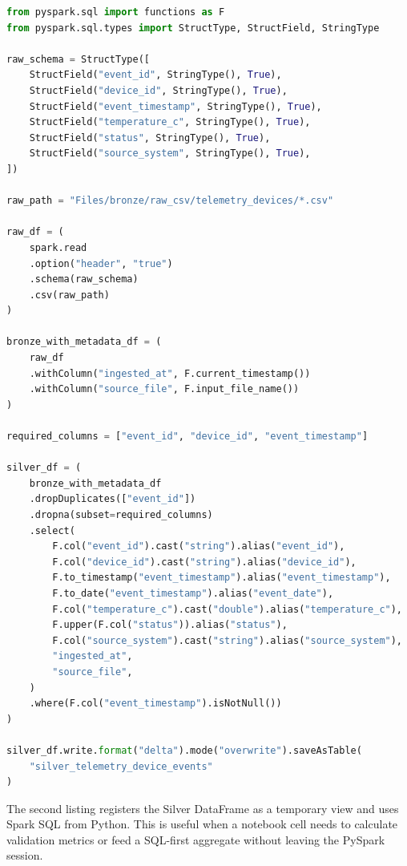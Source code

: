 \begin{lstlisting}[language=Python,caption={PySpark Bronze CSV to cleaned Silver Delta table.},label={lst:chapter3-bronze-csv-silver-delta}]
from pyspark.sql import functions as F
from pyspark.sql.types import StructType, StructField, StringType

raw_schema = StructType([
    StructField("event_id", StringType(), True),
    StructField("device_id", StringType(), True),
    StructField("event_timestamp", StringType(), True),
    StructField("temperature_c", StringType(), True),
    StructField("status", StringType(), True),
    StructField("source_system", StringType(), True),
])

raw_path = "Files/bronze/raw_csv/telemetry_devices/*.csv"

raw_df = (
    spark.read
    .option("header", "true")
    .schema(raw_schema)
    .csv(raw_path)
)

bronze_with_metadata_df = (
    raw_df
    .withColumn("ingested_at", F.current_timestamp())
    .withColumn("source_file", F.input_file_name())
)

required_columns = ["event_id", "device_id", "event_timestamp"]

silver_df = (
    bronze_with_metadata_df
    .dropDuplicates(["event_id"])
    .dropna(subset=required_columns)
    .select(
        F.col("event_id").cast("string").alias("event_id"),
        F.col("device_id").cast("string").alias("device_id"),
        F.to_timestamp("event_timestamp").alias("event_timestamp"),
        F.to_date("event_timestamp").alias("event_date"),
        F.col("temperature_c").cast("double").alias("temperature_c"),
        F.upper(F.col("status")).alias("status"),
        F.col("source_system").cast("string").alias("source_system"),
        "ingested_at",
        "source_file",
    )
    .where(F.col("event_timestamp").isNotNull())
)

silver_df.write.format("delta").mode("overwrite").saveAsTable(
    "silver_telemetry_device_events"
)
\end{lstlisting}

The second listing registers the Silver DataFrame as a temporary view and uses Spark SQL from Python. This is useful when a notebook cell needs to calculate validation metrics or feed a SQL-first aggregate without leaving the PySpark session.

